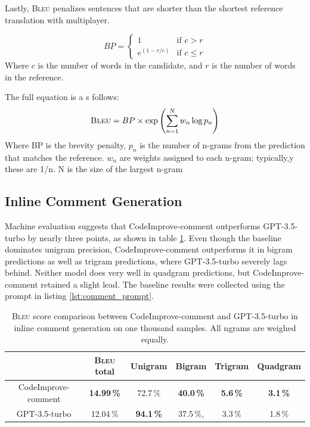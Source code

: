         Lastly, \textsc{Bleu} penalizes sentences that are shorter than the shortest reference translation with multiplayer.
    
        \begin{equation}
            BP = 
            \begin{cases} 
                1 & \text{if } c > r \\
                e^{(1-r/c)} & \text{if } c \leq r 
            \end{cases}
        \end{equation}
        Where $c$ is the number of words in the candidate, and $r$ is the number of words in the reference. 
        
        The full equation is a s follows:
        \begin{equation}
            \text{\textsc{Bleu}} = BP \times \exp\left(\sum_{n=1}^{N} w_n \log p_n\right)
        \end{equation}
        Where BP is the brevity penalty, $ p_n$ is the number of n-grams from the prediction that matches the reference. $w_n$ are weights assigned to each n-gram; typically,y these are 1/n. N is the size of the largest n-gram 
            
    \subsection{Inline Comment Generation}

    Machine evaluation suggests that CodeImprove-comment outperforms GPT-3.5-turbo by nearly three points, as shown in table \ref{tab:comment_perf}. Even though the baseline dominates unigram precision, CodeImprove-comment outperforms it in bigram predictions as well as trigram predictions, where GPT-3.5-turbo severely lags behind. Neither model does very well in quadgram predictions, but CodeImprove-comment retained a slight lead. The baseline results were collected using the prompt in listing \ref{lst:comment_prompt}.
    
    \begin{table}[H]
        \centering
        \begin{tabular}{|c||c|c|c|c|c|}
        \hline
         & \textsc{Bleu} total & Unigram & Bigram & Trigram & Quadgram \\
        \hline
        \hline
        CodeImprove-comment & \textbf{14.99\,\%} & 72.7\,\% & \textbf{40.0\,\%} & \textbf{5.6\,\%} & \textbf{3.1\,\%} \\
        \hline
        GPT-3.5-turbo & 12.04\,\% & \textbf{94.1\,\%} & 37.5\,\%, & 3.3\,\% & 1.8\,\% \\
        \hline
        \end{tabular}
        \caption{\textsc{Bleu} score comparison between CodeImprove-comment and GPT-3.5-turbo in inline comment generation on one thousand samples. All ngrams are weighed equally.}
        \label{tab:comment_perf}
    \end{table}
    
